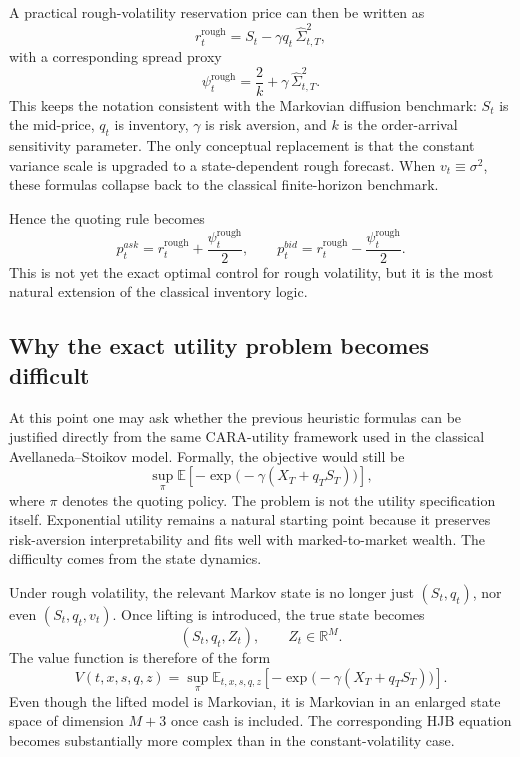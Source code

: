 A practical rough-volatility reservation price can then be written as
\[
r_t^{\mathrm{rough}}
=
S_t-\gamma q_t\,\widehat{\Sigma}_{t,T}^2,
\]
with a corresponding spread proxy
\[
\psi_t^{\mathrm{rough}}
=
\frac{2}{k}
+
\gamma\,\widehat{\Sigma}_{t,T}^2.
\]
This keeps the notation consistent with the Markovian diffusion benchmark: \(S_t\) is the mid-price, \(q_t\) is inventory, \(\gamma\) is risk aversion, and \(k\) is the order-arrival sensitivity parameter. The only conceptual replacement is that the constant variance scale is upgraded to a state-dependent rough forecast. When \(v_t\equiv \sigma^2\), these formulas collapse back to the classical finite-horizon benchmark.

Hence the quoting rule becomes
\[
p_t^{ask}=r_t^{\mathrm{rough}}+\frac{\psi_t^{\mathrm{rough}}}{2},
\qquad
p_t^{bid}=r_t^{\mathrm{rough}}-\frac{\psi_t^{\mathrm{rough}}}{2}.
\]
This is not yet the exact optimal control for rough volatility, but it is the most natural extension of the classical inventory logic.

\subsection{Why the exact utility problem becomes difficult}

At this point one may ask whether the previous heuristic formulas can be justified directly from the same CARA-utility framework used in the classical Avellaneda--Stoikov model. Formally, the objective would still be
\[
\sup_{\pi}
\mathbb{E}\!\left[
-\exp\!\bigl(-\gamma(X_T+q_TS_T)\bigr)
\right],
\]
where \(\pi\) denotes the quoting policy. The problem is not the utility specification itself. Exponential utility remains a natural starting point because it preserves risk-aversion interpretability and fits well with marked-to-market wealth. The difficulty comes from the state dynamics.

Under rough volatility, the relevant Markov state is no longer just \((S_t,q_t)\), nor even \((S_t,q_t,v_t)\). Once lifting is introduced, the true state becomes
\[
(S_t,q_t,Z_t),
\qquad
Z_t\in\mathbb{R}^M.
\]
The value function is therefore of the form
\[
V(t,x,s,q,z)
=
\sup_{\pi}
\mathbb{E}_{t,x,s,q,z}
\!\left[
-\exp\!\bigl(-\gamma(X_T+q_TS_T)\bigr)
\right].
\]
Even though the lifted model is Markovian, it is Markovian in an enlarged state space of dimension \(M+3\) once cash is included. The corresponding HJB equation becomes substantially more complex than in the constant-volatility case.

